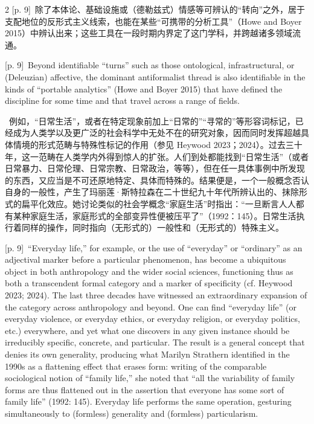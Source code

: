 \documentclass[10pt,a4paper]{article}
\begin{document}
\begin{paracol}{2}
{\scriptsize\color{gray} [p. 9]}\ 除了本体论、基础设施或（德勒兹式）情感等可辨认的“转向”之外，居于支配地位的反形式主义线索，也能在某些“可携带的分析工具”（Howe and Boyer 2015）中辨认出来；这些工具在一段时期内界定了这门学科，并跨越诸多领域流通。\par
\switchcolumn
{\scriptsize\color{gray} [p. 9]}\ Beyond identifiable “turns” such as those ontological, infrastructural, or (Deleuzian) affective, the dominant antiformalist thread is also identifiable in the kinds of “portable analytics” (Howe and Boyer 2015) that have defined the discipline for some time and that travel across a range of fields.\par
\switchcolumn*
{\scriptsize\color{gray} [p. 9]}\ 例如，“日常生活”，或者在特定现象前加上“日常的”“寻常的”等形容词标记，已经成为人类学以及更广泛的社会科学中无处不在的研究对象，因而同时发挥超越具体情境的形式范畴与特殊性标记的作用（参见 Heywood 2023；2024）。过去三十年，这一范畴在人类学内外得到惊人的扩张。人们到处都能找到“日常生活”（或者日常暴力、日常伦理、日常宗教、日常政治，等等），但在任一具体事例中所发现的东西，又应当是不可还原地特定、具体而特殊的。结果便是，一个一般概念否认自身的一般性，产生了玛丽莲·斯特拉森在二十世纪九十年代所辨认出的、抹除形式的扁平化效应。她讨论类似的社会学概念“家庭生活”时指出：“一旦断言人人都有某种家庭生活，家庭形式的全部变异性便被压平了”（1992：145）。日常生活执行着同样的操作，同时指向（无形式的）一般性和（无形式的）特殊主义。\par
\switchcolumn
{\scriptsize\color{gray} [p. 9]}\ “Everyday life,” for example, or the use of “everyday” or “ordinary” as an adjectival marker before a particular phenomenon, has become a ubiquitous object in both anthropology and the wider social sciences, functioning thus as both a transcendent formal category and a marker of specificity (cf. Heywood 2023; 2024). The last three decades have witnessed an extraordinary expansion of the category across anthropology and beyond. One can find “everyday life” (or everyday violence, or everyday ethics, or everyday religion, or everyday politics, etc.) everywhere, and yet what one discovers in any given instance should be irreducibly specific, concrete, and particular. The result is a general concept that denies its own generality, producing what Marilyn Strathern identified in the 1990s as a flattening effect that erases form: writing of the comparable sociological notion of “family life,” she noted that “all the variability of family forms are thus flattened out in the assertion that everyone has some sort of family life” (1992: 145). Everyday life performs the same operation, gesturing simultaneously to (formless) generality and (formless) particularism.\par

\end{paracol}
\end{document}
